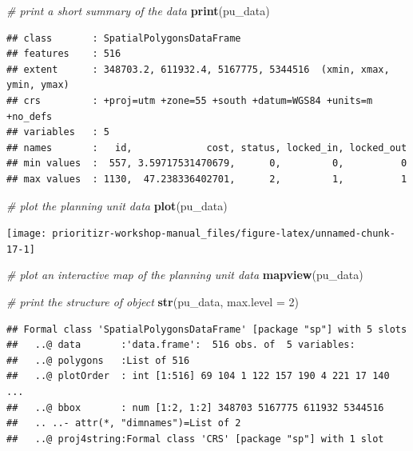 \documentclass[
  12pt,
]{book}
\newenvironment{Shaded}{\begin{snugshade}}{\end{snugshade}}
\newcommand{\CommentTok}[1]{\textcolor[rgb]{0.56,0.35,0.01}{\textit{#1}}}
\newcommand{\DataTypeTok}[1]{\textcolor[rgb]{0.13,0.29,0.53}{#1}}
\newcommand{\DecValTok}[1]{\textcolor[rgb]{0.00,0.00,0.81}{#1}}
\newcommand{\KeywordTok}[1]{\textcolor[rgb]{0.13,0.29,0.53}{\textbf{#1}}}
\newcommand{\NormalTok}[1]{#1}
\begin{document}
\begin{Shaded}
\begin{Highlighting}[]
\CommentTok{# print a short summary of the data}
\KeywordTok{print}\NormalTok{(pu_data)}
\end{Highlighting}
\end{Shaded}

\begin{verbatim}
## class       : SpatialPolygonsDataFrame 
## features    : 516 
## extent      : 348703.2, 611932.4, 5167775, 5344516  (xmin, xmax, ymin, ymax)
## crs         : +proj=utm +zone=55 +south +datum=WGS84 +units=m +no_defs 
## variables   : 5
## names       :   id,             cost, status, locked_in, locked_out 
## min values  :  557, 3.59717531470679,      0,         0,          0 
## max values  : 1130,  47.238336402701,      2,         1,          1
\end{verbatim}

\begin{Shaded}
\begin{Highlighting}[]
\CommentTok{# plot the planning unit data}
\KeywordTok{plot}\NormalTok{(pu_data)}
\end{Highlighting}
\end{Shaded}

\begin{center}\texttt{[image: prioritizr-workshop-manual\_files/figure-latex/unnamed-chunk-17-1]} \end{center}

\begin{Shaded}
\begin{Highlighting}[]
\CommentTok{# plot an interactive map of the planning unit data}
\KeywordTok{mapview}\NormalTok{(pu_data)}
\end{Highlighting}
\end{Shaded}

\begin{Shaded}
\begin{Highlighting}[]
\CommentTok{# print the structure of object}
\KeywordTok{str}\NormalTok{(pu_data, }\DataTypeTok{max.level =} \DecValTok{2}\NormalTok{)}
\end{Highlighting}
\end{Shaded}

\begin{verbatim}
## Formal class 'SpatialPolygonsDataFrame' [package "sp"] with 5 slots
##   ..@ data       :'data.frame':  516 obs. of  5 variables:
##   ..@ polygons   :List of 516
##   ..@ plotOrder  : int [1:516] 69 104 1 122 157 190 4 221 17 140 ...
##   ..@ bbox       : num [1:2, 1:2] 348703 5167775 611932 5344516
##   .. ..- attr(*, "dimnames")=List of 2
##   ..@ proj4string:Formal class 'CRS' [package "sp"] with 1 slot
\end{verbatim}
\end{document}
